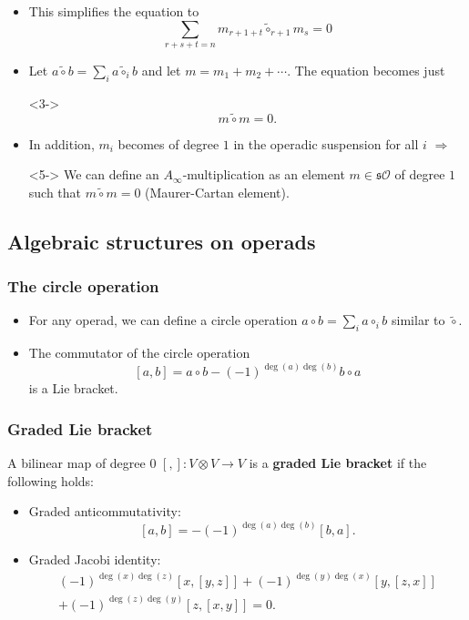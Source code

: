 \documentclass{beamer}
\theoremstyle{definition}
\begin{document}
\begin{frame}
\begin{itemize}
\item<1-> This simplifies the equation to
\[\sum_{r+s+t=n}m_{r+1+t}\tilde{\circ}_{r+1}m_s=0\] %
\item<2-> Let $a\tilde{\circ}b=\sum_{i}a\tilde{\circ}_ib$ and let $m=m_1+m_2+\cdots$. The equation becomes just
\item[]<3-> \[m\tilde{\circ}m=0.\] %
\item<4-> In addition, $m_i$ becomes of degree $1$ in the operadic suspension for all $i$ $\Rightarrow$
\item[]<5-> We can define an $A_\infty$-multiplication as an element $m\in\mathfrak{s}\mathcal{O}$ of degree $1$ such that $m\tilde{\circ}m=0$ (Maurer-Cartan element). 
\end{itemize}
\end{frame}
\subsection{Algebraic structures on operads}
\begin{frame}
\frametitle{The circle operation}
\begin{itemize}
\item<1-> For any operad, we can define a circle operation $a\circ b=\sum_i a\circ_i b$ similar to $\tilde{\circ}$. %
\item The commutator of the circle operation 
\[[a,b]=a\circ b-(-1)^{\deg(a)\deg(b)}b\circ a\]
is a Lie bracket.
\end{itemize}
\end{frame}

\begin{frame}
\frametitle{Graded Lie bracket}
A bilinear map of degree 0 $[,]:V\otimes V\to V$ is a \textbf{graded Lie bracket} if the following holds:
\begin{itemize}
\item<2-> Graded anticommutativity:
\[[a,b]=-(-1)^{\deg(a)\deg(b)}[b,a].\]
\item<3-> Graded Jacobi identity:
\begin{align*}
(-1)^{\deg(x)\deg(z)}[x,[y,z]] +(-1)^{\deg(y)\deg(x)}[y,[z,x]]\\ +(-1)^{\deg(z)\deg(y)}[z,[x,y]] = 0.
\end{align*}

\end{itemize}
\end{frame}
\end{document}
